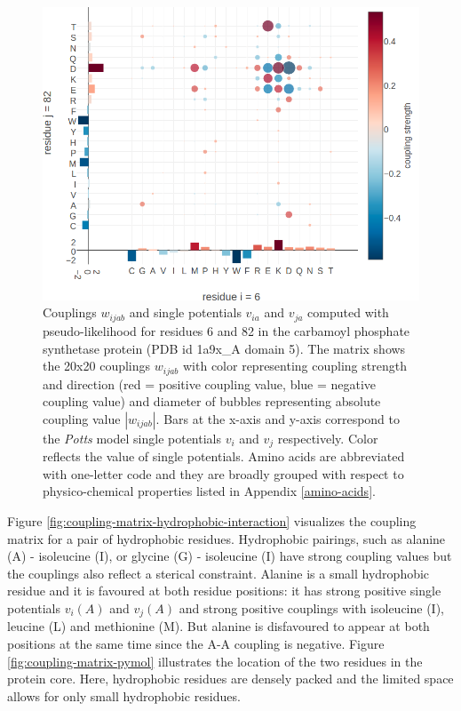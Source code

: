 \documentclass[11pt,a4paper,twoside]{book}
\newcommand{\vi}{v_{i}}
\newcommand{\vj}{v_{j}}
\newcommand{\via}{v_{ia}}
\newcommand{\vja}{v_{ja}}
\newcommand{\wijab}{w_{ijab}}
\theoremstyle{definition}
\theoremstyle{definition}
\theoremstyle{remark}
\begin{document}
\begin{figure}
\includegraphics[width=1\linewidth]{img/coupling_matrix_analysis/coupling_matrix_1a9xA05_6_82_notitle} \caption{Couplings \(\wijab\) and
single potentials \(\via\) and \(\vja\) computed with pseudo-likelihood
for residues 6 and 82 in the carbamoyl phosphate synthetase protein (PDB
id 1a9x\_A domain 5). The matrix shows the 20x20 couplings \(\wijab\)
with color representing coupling strength and direction (red = positive
coupling value, blue = negative coupling value) and diameter of bubbles
representing absolute coupling value \(|\wijab|\). Bars at the x-axis
and y-axis correspond to the \emph{Potts} model single potentials
\(\vi\) and \(\vj\) respectively. Color reflects the value of single
potentials. Amino acids are abbreviated with one-letter code and they
are broadly grouped with respect to physico-chemical properties listed
in Appendix \ref{amino-acids}.}\label{fig:coupling-matrix-ionic-interaction}
\end{figure}

Figure \ref{fig:coupling-matrix-hydrophobic-interaction} visualizes the
coupling matrix for a pair of hydrophobic residues. Hydrophobic
pairings, such as alanine (A) - isoleucine (I), or glycine (G) -
isoleucine (I) have strong coupling values but the couplings also
reflect a sterical constraint. Alanine is a small hydrophobic residue
and it is favoured at both residue positions: it has strong positive
single potentials \(\vi(A)\) and \(\vj(A)\) and strong positive
couplings with isoleucine (I), leucine (L) and methionine (M). But
alanine is disfavoured to appear at both positions at the same time
since the A-A coupling is negative. Figure
\ref{fig:coupling-matrix-pymol} illustrates the location of the two
residues in the protein core. Here, hydrophobic residues are densely
packed and the limited space allows for only small hydrophobic residues.
\end{document}
